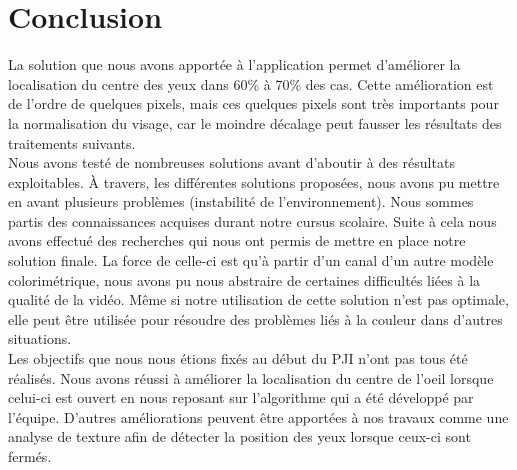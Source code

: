 \section{Conclusion}

La solution que nous avons apportée à l'application permet d'améliorer la localisation du centre des
yeux dans 60\% à 70\% des cas. Cette amélioration est de l'ordre de quelques pixels, mais ces quelques
pixels sont très importants pour la normalisation du visage, car le moindre décalage peut fausser les 
résultats des traitements suivants.\\

Nous avons testé de nombreuses solutions avant d'aboutir à des résultats exploitables. À travers, les différentes 
solutions proposées, nous avons pu mettre en avant plusieurs problèmes (instabilité de l'environnement).
Nous sommes partis des connaissances acquises durant notre cursus scolaire. 
Suite à cela nous avons effectué des recherches qui nous ont permis de mettre en place 
notre solution finale.
La force de celle-ci est qu'à partir d'un canal d'un autre modèle colorimétrique, nous avons pu 
nous abstraire de certaines difficultés liées à la qualité de la vidéo. Même si notre utilisation de cette
solution n'est pas optimale, elle peut être utilisée pour résoudre des problèmes liés à la couleur dans d'autres situations.\\

Les objectifs que nous nous étions fixés au début du PJI n'ont pas tous été réalisés. Nous avons réussi à
améliorer la localisation du centre de l'oeil lorsque celui-ci est ouvert en nous reposant sur 
l'algorithme qui a été développé par l'équipe. D'autres améliorations peuvent être apportées à nos travaux
comme une analyse de texture afin de détecter la position des yeux lorsque ceux-ci sont fermés.\\

